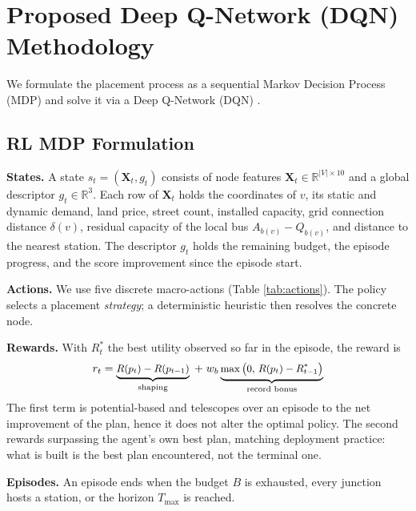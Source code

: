 \documentclass[10pt, conference, a4paper, compsocconf]{IEEEtran}
\begin{document}
\section{Proposed Deep Q-Network (DQN) Methodology}
\label{sec:method}

We formulate the placement process as a sequential Markov Decision Process (MDP) and solve it via a Deep Q-Network (DQN) \cite{mnih2015human}.

\subsection{RL MDP Formulation}

\textbf{States.} A state $s_t = (\mathbf{X}_t, g_t)$ consists of node features $\mathbf{X}_t \in \mathbb{R}^{|V| \times 10}$ and a global descriptor $g_t \in \mathbb{R}^3$. Each row of $\mathbf{X}_t$ holds the coordinates of $v$, its static and dynamic demand, land price, street count, installed capacity, grid connection distance $\delta(v)$, residual capacity of the local bus $A_{b(v)} - Q_{b(v)}$, and distance to the nearest station. The descriptor $g_t$ holds the remaining budget, the episode progress, and the score improvement since the episode start.

\textbf{Actions.} We use five discrete macro-actions (Table \ref{tab:actions}). The policy selects a placement \emph{strategy}; a deterministic heuristic then resolves the concrete node.

\textbf{Rewards.} With $R^{*}_{t}$ the best utility observed so far in the episode, the reward is
\begin{equation}\small
\label{eq:reward}
r_t = \underbrace{R(p_t) - R(p_{t-1})}_{\text{shaping}} \; + \; w_b \underbrace{\max \big( 0, \, R(p_t) - R^{*}_{t-1} \big)}_{\text{record bonus}}
\end{equation}
The first term is potential-based and telescopes over an episode to the net improvement of the plan, hence it does not alter the optimal policy. The second rewards surpassing the agent's own best plan, matching deployment practice: what is built is the best plan encountered, not the terminal one.

\textbf{Episodes.} An episode ends when the budget $B$ is exhausted, every junction hosts a station, or the horizon $ T_{\max}$ is reached.
\end{document}
